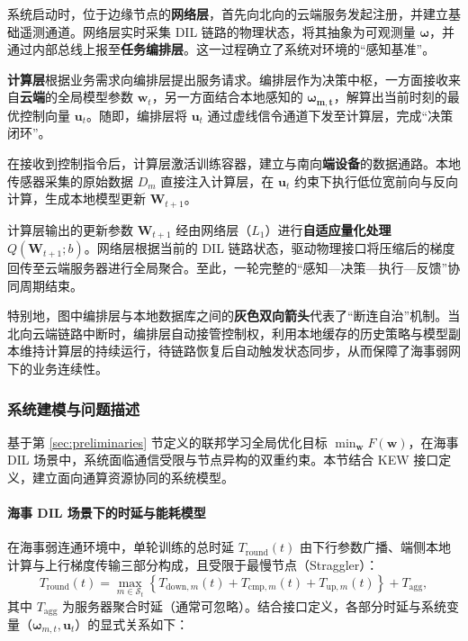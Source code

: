 系统启动时，位于边缘节点的\textbf{网络层}，首先向北向的云端服务发起注册，并建立基础遥测通道。网络层实时采集 DIL 链路的物理状态，将其抽象为可观测量 $\boldsymbol{\omega}$，并通过内部总线上报至\textbf{任务编排层}。这一过程确立了系统对环境的“感知基准”。

\textbf{计算层}根据业务需求向编排层提出服务请求。编排层作为决策中枢，一方面接收来自\textbf{云端}的全局模型参数 $\mathbf{w}_t$，另一方面结合本地感知的 $\boldsymbol{\omega_{m,t}}$，解算出当前时刻的最优控制向量 $\mathbf{u}_t$。随即，编排层将 $\mathbf{u}_t$ 通过虚线信令通道下发至计算层，完成“决策闭环”。

在接收到控制指令后，计算层激活训练容器，建立与南向\textbf{端设备}的数据通路。本地传感器采集的原始数据 $D_m$ 直接注入计算层，在 $\mathbf{u}_t$ 约束下执行低位宽前向与反向计算，生成本地模型更新 $\mathbf{W}_{t+1}$。
 
计算层输出的更新参数 $\mathbf{W}_{t+1}$ 经由网络层（$L_1$）进行\textbf{自适应量化处理 $Q(\mathbf{W}_{t+1}; b)$}。网络层根据当前的 DIL 链路状态，驱动物理接口将压缩后的梯度回传至云端服务器进行全局聚合。至此，一轮完整的“感知—决策—执行—反馈”协同周期结束。

特别地，图中编排层与本地数据库之间的\textbf{灰色双向箭头}代表了“断连自治”机制。当北向云端链路中断时，编排层自动接管控制权，利用本地缓存的历史策略与模型副本维持计算层的持续运行，待链路恢复后自动触发状态同步，从而保障了海事弱网下的业务连续性。


\subsubsection{系统建模与问题描述} \label{sec:modeling}

基于第 \ref{sec:preliminaries} 节定义的联邦学习全局优化目标 $\min_{\mathbf{w}} F(\mathbf{w})$，在海事 DIL 场景中，系统面临通信受限与节点异构的双重约束。本节结合 KEW 接口定义，建立面向通算资源协同的系统模型。

\paragraph{海事 DIL 场景下的时延与能耗模型}
在海事弱连通环境中，单轮训练的总时延 $T_{\text{round}}(t)$ 由下行参数广播、端侧本地计算与上行梯度传输三部分构成，且受限于最慢节点（Straggler）：
\begin{equation} 
	T_{\text{round}}(t) = \max_{m \in \mathcal{S}_t} \left\{ T_{\text{down},m}(t) + T_{\text{cmp},m}(t) + T_{\text{up},m}(t) \right\} + T_{\text{agg}},
	\label{eq:t_round} 
\end{equation}
其中 $T_{\text{agg}}$ 为服务器聚合时延（通常可忽略）。结合接口定义，各部分时延与系统变量（$\boldsymbol{\omega}_{m,t}, \mathbf{u}_t$）的显式关系如下：

